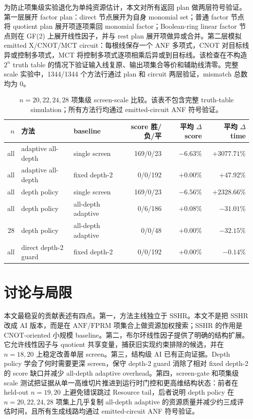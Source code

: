 \documentclass[UTF8,fontset=macnew,11pt]{ctexart}
\newcommand{\anf}{\ensuremath{\mathrm{ANF}}}
\newcommand{\fprm}{\ensuremath{\mathrm{FPRM}}}
\begin{document}
为防止项集级实验退化为单纯资源估计，本文对所有返回 plan 做两层符号验证。第一层展开 factor plan：direct 节点展开为自身 monomial set；普通 factor 节点将 quotient plan 展开项逐项乘回 monomial factor；Boolean-ring linear factor 节点则在 GF(2) 上展开线性因子，并与 rest plan 展开项做异或合并。第二层模拟 emitted X/CNOT/MCT circuit：每根线保存一个 ANF 多项式，CNOT 对目标线异或控制多项式，MCT 将控制多项式逐项相乘后异或到目标线。该检查在不构造 $2^n$ truth table 的情况下验证输入线复原、输出项集合等价和辅助线清零。完整 scale 实验中，1344/1344 个方法行通过 plan 和 circuit 两层验证，mismatch 总数均为 0。

\begin{table}[t]
\centering
\scriptsize
\caption{$n=20,22,24,28$ 项集级 screen-scale 比较。该表不包含完整 truth-table simulation；所有方法行均通过 emitted-circuit ANF 符号验证。}
\label{tab:scale}
\begin{tabular}{rllrrr}
\toprule
$n$ & 方法 & baseline & score 胜/负/平 & 平均 $\Delta$ score & 平均 $\Delta$ time \\
\midrule
all & adaptive all-depth & single screen & 169/0/23 & $-6.63\%$ & $+3077.71\%$ \\
all & adaptive all-depth & fixed depth-2 & 0/0/192 & $+0.00\%$ & $+47.92\%$ \\
all & depth policy & single screen & 169/0/23 & $-6.56\%$ & $+2328.66\%$ \\
all & depth policy & all-depth adaptive & 0/6/186 & $+0.08\%$ & $-31.01\%$ \\
28 & depth policy & all-depth adaptive & 0/0/48 & $+0.00\%$ & $-32.15\%$ \\
all & direct depth-2 guard & fixed depth-2 & 0/0/192 & $+0.00\%$ & $-0.14\%$ \\
\bottomrule
\end{tabular}
\end{table}

\section{讨论与局限}

本文最稳妥的贡献表述有四点。第一，方法主线独立于 SSHR。本文不是把 SSHR 改成 AI 版本，而是在 \anf{}/\fprm{} 项集合上做资源加权搜索；SSHR 的作用是 CNOT-oriented 小规模 baseline。第二，布尔环线性因子提供了明确的结构扩展。它允许线性因子与 quotient 共享变量，捕获旧实现约束排除的候选，并在 $n=18,20$ 上稳定改善单层 screen。第三，结构级 AI 已有正向证据。Depth policy 学会了何时需要更深 screen，保守 depth-2 guard 消除了相对 fixed depth-2 的 score 缺口并减少 all-depth adaptive overhead。第四，screen-gate 和项集级 scale 测试把证据从单一高维切片推进到运行时门控和更高维结构状态：前者在 held-out $n=19,20$ 上避免错误跳过 Resource tail，后者说明 depth policy 在 $n=20,22,24,28$ 项集上几乎复制 all-depth adaptive 的资源质量并减少约三成评估时间，且所有生成线路均通过 emitted-circuit ANF 符号验证。
\end{document}
